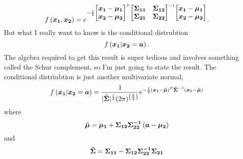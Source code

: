 \documentclass[../../main.tex]{subfiles}
\begin{document}
\begin{equation}
    f\left(\boldsymbol{x_1}, \boldsymbol{x_2} \right)
     = e^{
        -\frac{1}{2}
        \begin{bmatrix}
            \boldsymbol{x_1} - \boldsymbol{\mu_1} \\
            \boldsymbol{x_2} - \boldsymbol{\mu_2}
        \end{bmatrix}^T
        \begin{bmatrix}
            \boldsymbol{\Sigma_{11}} & \boldsymbol{\Sigma_{12}} \\ 
            \boldsymbol{\Sigma_{21}} & \boldsymbol{\Sigma_{22}} \\
        \end{bmatrix}^{-1}
        \begin{bmatrix}
            \boldsymbol{x_1} - \boldsymbol{\mu_1} \\
            \boldsymbol{x_2} - \boldsymbol{\mu_2}
        \end{bmatrix}
     }.
\end{equation}
But what I really want to know is the conditional distrubtion
\begin{equation}
    f\left(\boldsymbol{x_1}| \boldsymbol{x_2}=\boldsymbol{a} \right).
\end{equation}
The algebra required to get this result is super tedious and involves
something called the Schur complement, so I'm just going to state the result.
The conditional distriubtion is just another multivariate normal, 
\begin{equation}
    f\left(\boldsymbol{x_1}| \boldsymbol{x_2}=\boldsymbol{a} \right) = 
        \frac{1}{
                    |\boldsymbol{\bar\Sigma}|^\frac{1}{2} (2\pi)^{\left(\frac{k}{2}\right)}
                }
                e^{
                    -\frac{1}{2}
                    (\boldsymbol{x_1} - \boldsymbol{\bar\mu})^T
                    \boldsymbol{\bar\Sigma}^{-1}
                    (\boldsymbol{x_1} - \boldsymbol{\bar\mu})
            }
\end{equation}
where
\begin{equation}
    \boldsymbol{\bar{\mu}} = \boldsymbol{\mu_1} + \boldsymbol{\Sigma_{12}\Sigma_{22}^{-1}}
    \left( \boldsymbol{a} - \boldsymbol{\mu_2} \right)
\end{equation}
and
\begin{equation}
    \boldsymbol{\bar{\Sigma}} =
        \boldsymbol{\Sigma_{11}} - \boldsymbol{\Sigma_{12}\Sigma_{22}^{-1}\Sigma_{21}}
\end{equation}
\end{document}
